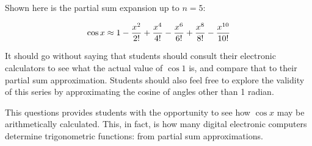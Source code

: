 \vskip 10pt

Shown here is the partial sum expansion up to $n = 5$:

$$\cos x \approx 1 - {x^{2} \over 2!} + {x^{4} \over 4!} - {x^{6} \over 6!} + {x^{8} \over 8!} - {x^{10} \over 10!}$$







It should go without saying that students should consult their electronic calculators to see what the actual value of $\cos 1$ is, and compare that to their partial sum approximation.  Students should also feel free to explore the validity of this series by approximating the cosine of angles other than 1 radian.

This questions provides students with the opportunity to see how $\cos x$ may be arithmetically calculated.  This, in fact, is how many digital electronic computers determine trigonometric functions: from partial sum approximations.




